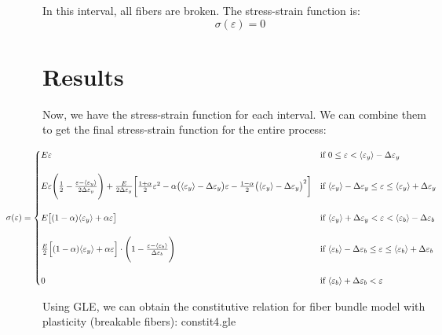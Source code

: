 \documentclass{article}
\newcommand{\eps}{\varepsilon}
\newcommand{\avg}[1]{\langle #1 \rangle}
\newcommand{\ey}{\avg{\eps_y}}
\newcommand{\eb}{\avg{\eps_b}}
\newcommand{\dey}{\Delta \varepsilon_y}
\newcommand{\deb}{\Delta \varepsilon_b}
\begin{document}
\indent
In this interval, all fibers are broken. The stress-strain function is:
\begin{equation}
    \sigma(\eps) = 0
\end{equation}


\section{Results}

\indent
Now, we have the stress-strain function for each interval. We can combine them to get the final stress-strain function for the entire process:

\begin{equation*}
\hspace*{-1.5cm}
\sigma(\eps) =
    \begin{cases} 
        E \eps 
        & \text{if } 0 \leq \eps < \avg{\eps_y} - \dey \\ \\
        E \eps \Bigg( \frac{1}{2} - \frac{\eps - \ey}{2 \dey} \Bigg) + \frac{E}{2 \dey} \bigg[ \frac{1 + \alpha}{2} \eps^2 - \alpha \big(\ey - \dey \big) \eps - \frac{1 - \alpha}{2} \big(\ey - \dey\big)^2 \bigg] 
        & \text{if } \avg{\eps_y} - \dey \leq \eps \leq \avg{\eps_y} + \dey \\ \\
        E \big[ (1 - \alpha) \ey + \alpha \eps \big]
        & \text{if } \avg{\eps_y} + \dey < \eps < \avg{\eps_b} - \deb \\ \\
        \frac{E}{2} \Big[ (1 - \alpha) \ey + \alpha \eps \Big] \cdot \Bigg( 1 - \frac{\eps - \eb}{\deb} \Bigg) 
        & \text{if } \avg{\eps_b} - \deb \leq \eps \leq \avg{\eps_b} + \deb \\ \\
        0 
        & \text{if } \eb + \deb < \eps
    \end{cases}
\end{equation*}

Using GLE, we can obtain the constitutive relation for fiber bundle model with plasticity (breakable fibers): constit4.gle

\end{document}
